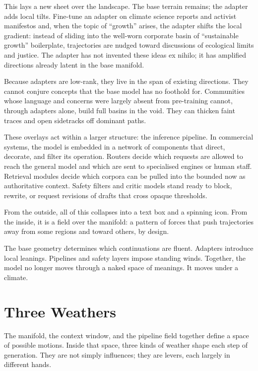 \documentclass[12pt,a4paper]{article}
\begin{document}
This lays a new sheet over the landscape. The base terrain remains; the adapter adds local tilts. Fine-tune an adapter on climate science reports and activist manifestos and, when the topic of ``growth'' arises, the adapter shifts the local gradient: instead of sliding into the well-worn corporate basin of ``sustainable growth'' boilerplate, trajectories are nudged toward discussions of ecological limits and justice. The adapter has not invented these ideas ex nihilo; it has amplified directions already latent in the base manifold.

Because adapters are low-rank, they live in the span of existing directions. They cannot conjure concepts that the base model has no foothold for. Communities whose language and concerns were largely absent from pre-training cannot, through adapters alone, build full basins in the void. They can thicken faint traces and open sidetracks off dominant paths.

These overlays act within a larger structure: the inference pipeline. In commercial systems, the model is embedded in a network of components that direct, decorate, and filter its operation. Routers decide which requests are allowed to reach the general model and which are sent to specialised engines or human staff. Retrieval modules decide which corpora can be pulled into the bounded now as authoritative context. Safety filters and critic models stand ready to block, rewrite, or request revisions of drafts that cross opaque thresholds.

From the outside, all of this collapses into a text box and a spinning icon. From the inside, it is a field over the manifold: a pattern of forces that push trajectories away from some regions and toward others, by design.

The base geometry determines which continuations are fluent. Adapters introduce local leanings. Pipelines and safety layers impose standing winds. Together, the model no longer moves through a naked space of meanings. It moves under a climate.

\section{Three Weathers}

The manifold, the context window, and the pipeline field together define a space of possible motions. Inside that space, three kinds of weather shape each step of generation. They are not simply influences; they are levers, each largely in different hands.
\end{document}
